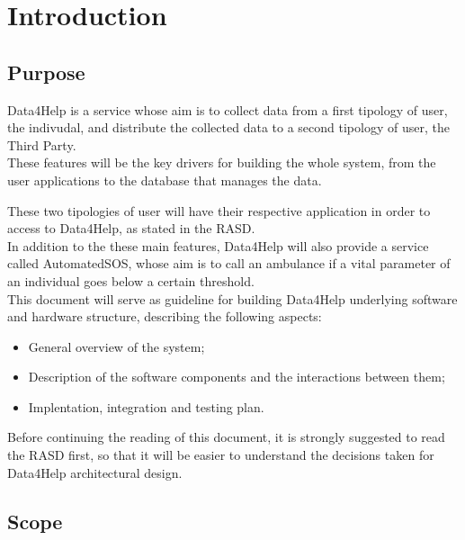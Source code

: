 
\chapter{Introduction} \label{c:intro}

\section{Purpose}
Data4Help is a service whose aim is to collect data from a first tipology of user, the indivudal, and distribute the collected data to a second tipology of user, the Third Party.\\
These features will be the key drivers for building the whole system, from the user applications to the database that manages the data.

These two tipologies of user will have their respective application in order to access to Data4Help, as stated in the RASD. 
\\
In addition to the these main features, Data4Help will also provide a service called AutomatedSOS, whose aim is to call an ambulance if a vital parameter of an individual goes below a certain threshold.
\\
This document will serve as guideline for building Data4Help underlying software and hardware structure, describing the following aspects:
\begin{itemize}
\item General overview of the system;
\item Description of the software components and the interactions between them;
\item Implentation, integration and testing plan.
\end{itemize}

Before continuing the reading of this document, it is strongly suggested to read the RASD first, so that it will be easier to understand the decisions taken for Data4Help architectural design.


\section{Scope}

